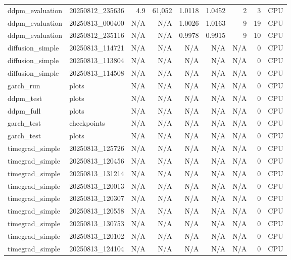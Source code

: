 \begin{table}
\begin{tabular}{l|l|r|r|r|r|r|r|l}
ddpm_evaluation & 20250812_235636 & 4.9 & 61,052 & 1.0118 & 1.0452 & 2 & 3 & CPU \\
ddpm_evaluation & 20250813_000400 & N/A & N/A & 1.0026 & 1.0163 & 9 & 19 & CPU \\
ddpm_evaluation & 20250812_235116 & N/A & N/A & 0.9978 & 0.9915 & 9 & 10 & CPU \\
diffusion_simple & 20250813_114721 & N/A & N/A & N/A & N/A & N/A & 0 & CPU \\
diffusion_simple & 20250813_113804 & N/A & N/A & N/A & N/A & N/A & 0 & CPU \\
diffusion_simple & 20250813_114508 & N/A & N/A & N/A & N/A & N/A & 0 & CPU \\
garch_run & plots & N/A & N/A & N/A & N/A & N/A & 0 & CPU \\
ddpm_test & plots & N/A & N/A & N/A & N/A & N/A & 0 & CPU \\
ddpm_full & plots & N/A & N/A & N/A & N/A & N/A & 0 & CPU \\
garch_test & checkpoints & N/A & N/A & N/A & N/A & N/A & 0 & CPU \\
garch_test & plots & N/A & N/A & N/A & N/A & N/A & 0 & CPU \\
timegrad_simple & 20250813_125726 & N/A & N/A & N/A & N/A & N/A & 0 & CPU \\
timegrad_simple & 20250813_120456 & N/A & N/A & N/A & N/A & N/A & 0 & CPU \\
timegrad_simple & 20250813_131214 & N/A & N/A & N/A & N/A & N/A & 0 & CPU \\
timegrad_simple & 20250813_120013 & N/A & N/A & N/A & N/A & N/A & 0 & CPU \\
timegrad_simple & 20250813_120307 & N/A & N/A & N/A & N/A & N/A & 0 & CPU \\
timegrad_simple & 20250813_120558 & N/A & N/A & N/A & N/A & N/A & 0 & CPU \\
timegrad_simple & 20250813_130753 & N/A & N/A & N/A & N/A & N/A & 0 & CPU \\
timegrad_simple & 20250813_120102 & N/A & N/A & N/A & N/A & N/A & 0 & CPU \\
timegrad_simple & 20250813_124104 & N/A & N/A & N/A & N/A & N/A & 0 & CPU \\
\bottomrule
\end{tabular}
\end{table}
